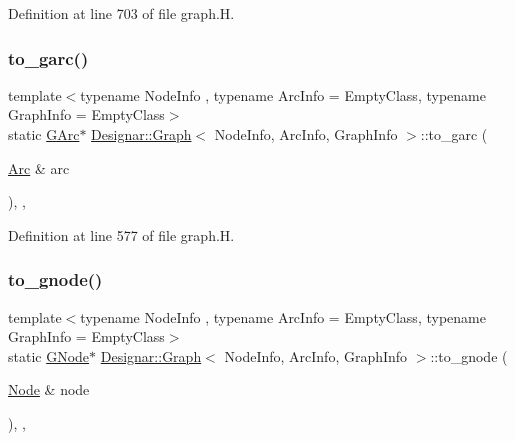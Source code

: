 Definition at line 703 of file graph.\+H.

\mbox{\label{class_designar_1_1_graph_ab79eb63dd332e483db77da69c1b04522}} 
\subsubsection{\texorpdfstring{to\+\_\+garc()}{to\_garc()}}
{\footnotesize\ttfamily template$<$typename Node\+Info , typename Arc\+Info  = Empty\+Class, typename Graph\+Info  = Empty\+Class$>$ \\
static \hyperlink{class_designar_1_1_graph_a5ad9e18b71899c2d4979426e367e5573}{G\+Arc}$\ast$ \hyperlink{class_designar_1_1_graph}{Designar\+::\+Graph}$<$ Node\+Info, Arc\+Info, Graph\+Info $>$\+::to\+\_\+garc (\begin{DoxyParamCaption}\item[{\hyperlink{class_designar_1_1_graph_a74c730ef4ce2d20f998d72bd25c2b5bf}{Arc} \&}]{arc }\end{DoxyParamCaption})\hspace{0.3cm}{\ttfamily [inline]}, {\ttfamily [static]}, {\ttfamily [protected]}}



Definition at line 577 of file graph.\+H.

\mbox{\label{class_designar_1_1_graph_a23038b7502c6fdb53b23453b19579c0e}} 
\subsubsection{\texorpdfstring{to\+\_\+gnode()}{to\_gnode()}}
{\footnotesize\ttfamily template$<$typename Node\+Info , typename Arc\+Info  = Empty\+Class, typename Graph\+Info  = Empty\+Class$>$ \\
static \hyperlink{class_designar_1_1_graph_a7e61951db0bb9bfa8a2e317440d4e17f}{G\+Node}$\ast$ \hyperlink{class_designar_1_1_graph}{Designar\+::\+Graph}$<$ Node\+Info, Arc\+Info, Graph\+Info $>$\+::to\+\_\+gnode (\begin{DoxyParamCaption}\item[{\hyperlink{class_designar_1_1_graph_a5dfc7dba9d092ac489c72e40390c37d0}{Node} \&}]{node }\end{DoxyParamCaption})\hspace{0.3cm}{\ttfamily [inline]}, {\ttfamily [static]}, {\ttfamily [protected]}}



